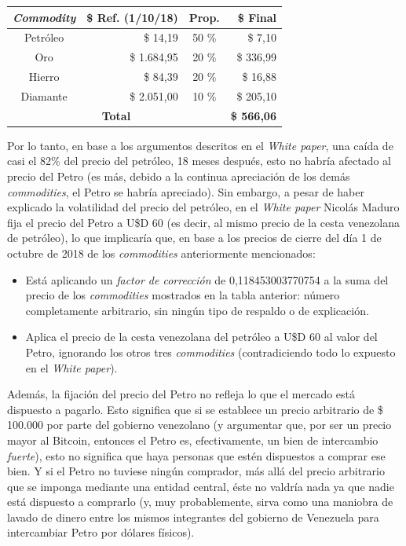\documentclass[12pt,a4paper,twoside]{book}
\begin{document}
\begin{center}
\begin{tabular}{|c|r|c|r|}
\hline 
\textbf{\textit{Commodity}} & \textbf{\$ Ref. (1/10/18)} & \textbf{Prop.} & \textbf{\$ Final} \\ 
\hline 
Petróleo & \$ 14,19 & 50 \% & \$ 7,10 \\ 
\hline 
Oro & \$ 1.684,95 & 20 \% & \$ 336,99 \\ 
\hline 
Hierro & \$ 84,39 & 20 \% & \$ 16,88 \\ 
\hline 
Diamante & \$ 2.051,00 & 10 \% & \$ 205,10 \\ 
\hline 
\multicolumn{3}{|c|}{\textbf{Total}} & \textbf{\$ 566,06} \\ 
\hline 
\end{tabular}
\end{center}

Por lo tanto, en base a los argumentos descritos en el \textit{White paper}, una caída de casi el 82\% del precio del petróleo, 18 meses después, esto no habría afectado al precio del Petro (es más, debido a la continua apreciación  de los demás \textit{commodities}, el Petro se habría apreciado). Sin embargo, a pesar de haber explicado la volatilidad del precio del petróleo, en el \textit{White paper} Nicolás Maduro fija el precio del Petro a U\$D 60 (es decir, al mismo precio de la cesta venezolana de petróleo), lo que implicaría que, en base a los precios de cierre del día 1 de octubre de 2018 de los \textit{commodities} anteriormente mencionados:

\begin{itemize}
\item Está aplicando un \textit{factor de corrección} de 0,118453003770754 a la suma del precio de los \textit{commodities} mostrados en la tabla anterior: número completamente arbitrario, sin ningún tipo de respaldo o de explicación.
\item Aplica el precio de la cesta venezolana del petróleo a U\$D 60 al valor del Petro, ignorando los otros tres \textit{commodities} (contradiciendo todo lo expuesto en el \textit{White paper}).
\end{itemize}

Además, la fijación del precio del Petro no refleja lo que el mercado está dispuesto a pagarlo. Esto significa que si se establece un precio arbitrario de \$ 100.000 por parte del gobierno venezolano (y argumentar que, por ser un precio mayor al Bitcoin, entonces el Petro es, efectivamente, un bien de intercambio \textit{fuerte}), esto no significa que haya personas que estén dispuestos a comprar ese bien. Y si el Petro no tuviese ningún comprador, más allá del precio arbitrario que se imponga mediante una entidad central, éste no valdría nada ya que nadie está dispuesto a comprarlo (y, muy probablemente, sirva como una maniobra de lavado de dinero entre los mismos integrantes del gobierno de Venezuela para intercambiar Petro por dólares físicos).
\end{document}
